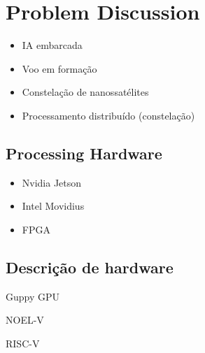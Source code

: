 %
%
%
%
%

%
%
%
%
%

\section{Problem Discussion} \label{sec:problem-discussion}

\cite{marcelino2018}

\cite{marcelino2016}

\begin{itemize}
    \item IA embarcada
    \item Voo em formação
    \item Constelação de nanossatélites
    \item Processamento distribuído (constelação)
\end{itemize}

\subsection{Processing Hardware}

\begin{itemize}
    \item Nvidia Jetson
    \item Intel Movidius
    \item FPGA
\end{itemize}

\subsection{Descrição de hardware}

Guppy GPU \cite{al-dujaili2012}

NOEL-V \cite{andersson2020}

RISC-V \cite{waterman2016}
